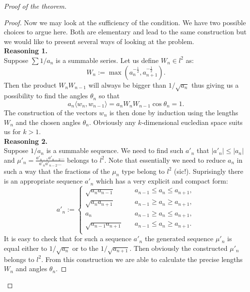 \documentclass[12pt]{article}
\renewcommand{\leq}{\leqslant}
\renewcommand{\geq}{\geqslant}
\theoremstyle{definition}
\numberwithin{remark}{section}
\numberwithin{theorem}{section}
\numberwithin{prop}{section}
\numberwithin{equation}{section}
\numberwithin{lemma}{section}
\numberwithin{prop_under_lemma}{lemma}
\begin{document}
\begin{proof}[Proof of the theorem]
\begin{proof}
            Now we may look at the sufficiency of the condition.
            We have two possible choices to argue here. Both are elementary and lead to the same construction but we would
            like to present several ways of looking at the problem.\\
            \textbf{Reasoning 1.}\\
            Suppose $\sum 1/a_n$ is a summable series. Let us define $W_n \in l^2$ as:
            $$
            W_n := \max(a_n^{-\frac{1}{2}}, a^{-\frac{1}{2}}_{n+1}).
            $$
            Then the product $W_nW_{n-1}$ will always be bigger than $1/\sqrt{a_n}$ thus giving us a possibility to
            find the angles $\theta_n$ so that 
            $$
            a_n \langle w_n, w_{n-1} \rangle = a_n W_n W_{n-1}\cos{\theta_n} = 1.
            $$
            The construction of the vectors $w_n$ is then done by induction using the lengths $W_n$ and the chosen
            angles $\theta_n$. Obviously any $k$-dimensional eucledian space suits us for $k > 1$.\\
            \textbf{Reasoning 2.}\\
            Suppose $1/a_n$ is a summable sequence. We need to find such $a'_n$ that $|a'_n| \leq |a_n|$ and
            $\mu'_n = \frac{a'_{n-1} a'_{n-3} \dots}{a'_{n} a'_{n-2} \dots }$ belongs to $l^2$. Note that essentially we need to reduce $a_n$ in such a way that the fractions of the $\mu_n$ type belong to $l^2$ (sic!). Suprisingly there is an appropriate sequence $a'_n$ which has a very explicit and compact form:
            \begin{equation*}
                a'_n := \begin{cases}
                    \sqrt{a_n a_{n-1}} & \quad a_{n-1} \leq a_n \leq a_{n+1},\\
                    \sqrt{a_n a_{n+1}} & \quad a_{n-1} \geq a_n \geq a_{n+1},\\
                    a_n & \quad a_{n-1} \geq a_n \leq a_{n+1},\\
                    \sqrt{a_{n-1} a_{n+1}} &\quad a_{n-1} \leq a_n \geq a_{n+1}.\\
                \end{cases}
            \end{equation*}
            It is easy to check that for such a sequence $a'_n$ the generated sequence $\mu'_n$ is equal either to $1/\sqrt{a_n}$ or to the $1/\sqrt{a_{n+1}}$. Then obviously the constructed $\mu'_n$ belongs to $l^2$.
            From this construction we are able to calculate the precise lengths $W_n$ and angles $\theta_n$.

\end{proof}
\end{proof}
\end{document}
